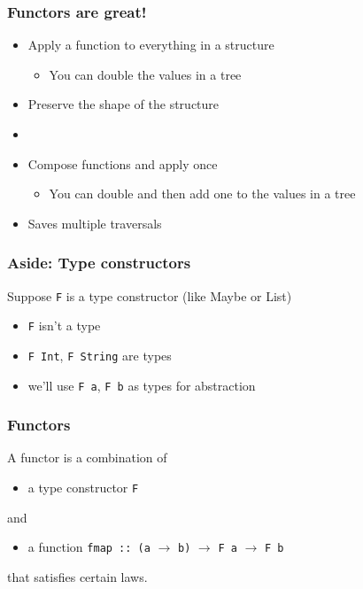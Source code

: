 \documentclass{beamer}
\begin{document}
\begin{frame}
    \frametitle {Functors are great!}
\begin{itemize}
\item Apply a function to everything in a structure
    \begin{itemize}
    \item You can double the values in a tree
    \end{itemize}
\item Preserve the shape of the structure
\item[]
\item Compose functions and apply once 
    \begin{itemize}
    \item You can double and then add one to the values in a tree
    \end{itemize}
\item Saves multiple traversals
\end{itemize}
\end{frame}

\begin{frame}[fragile]
    \frametitle {Aside: Type constructors}

Suppose \verb?F? is a type constructor (like Maybe or List)
\begin{itemize}
\item \Verb?F? isn't a type
\item \Verb?F Int?, \Verb?F String? are types
\item we'll use \Verb?F a?, \Verb?F b? as types for abstraction
\end{itemize}

\end{frame}

\begin{frame}[fragile]
    \frametitle {Functors}
A functor is a combination of 
\begin{itemize}
\item a type constructor \verb?F? 
\end{itemize}
and 
\begin{itemize}
\item a function \verb?fmap :: (a? $\rightarrow$ \verb?b)? $\rightarrow$ \verb?F a? $\rightarrow$ \verb?F b?
\end{itemize}
that satisfies certain laws.

\end{frame}
\end{document}
